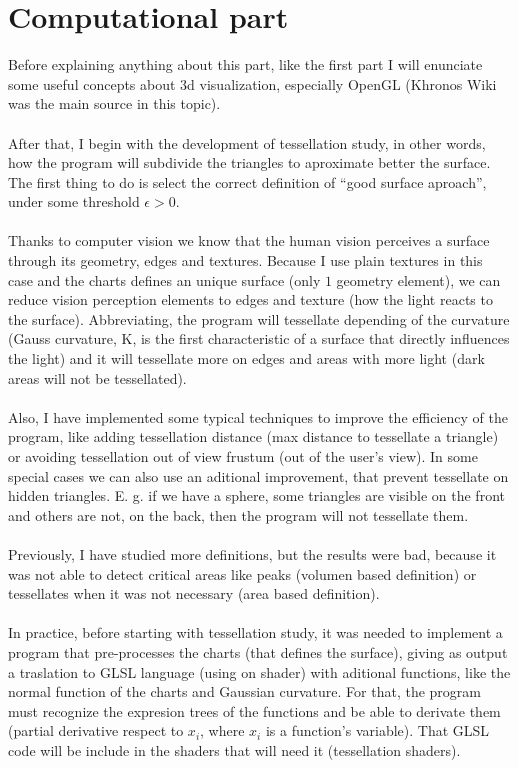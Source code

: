 \section*{Computational part}
Before explaining anything about this part, like the first part I will enunciate some useful concepts about $3$d visualization, especially OpenGL (Khronos Wiki \cite{KhronosWiki} was the main source in this topic).\\
\\After that, I begin with the development of tessellation study, in other words, how the program will subdivide the triangles to aproximate better the surface. The first thing to do is select the correct definition of ``good surface aproach'', under some threshold $\epsilon>0$.\\
\\Thanks to computer vision we know that the human vision perceives a surface through its geometry, edges and textures. Because I use plain textures in this case and the charts defines an unique surface (only $1$ geometry element), we can reduce vision perception elements to edges and texture (how the light reacts to the surface). Abbreviating, the program will tessellate depending of the curvature (Gauss curvature, K, is the first characteristic of a surface that directly influences the light) and it will tessellate more on edges and areas with more light (dark areas will not be tessellated).\\
\\Also, I have implemented some typical techniques to improve the efficiency of the program, like adding tessellation distance (max distance to tessellate a triangle) or avoiding tessellation out of view frustum (out of the user's view). In some special cases we can also use an aditional improvement, that prevent tessellate on hidden triangles. E. g. if we have a sphere, some triangles are visible on the front and others are not, on the back, then the program will not tessellate them.\\
\\Previously, I have studied more definitions, but the results were bad, because it was not able to detect critical areas like peaks (volumen based definition) or tessellates when it was not necessary (area based definition).\\
\\In practice, before starting with tessellation study, it was needed to implement a program that pre-processes the charts (that defines the surface), giving as output a traslation to GLSL language (using on shader) with aditional functions, like the normal function of the charts and Gaussian curvature. For that, the program must recognize the expresion trees of the functions and be able to derivate them (partial derivative respect to $x_i$, where $x_i$ is a function's variable). That GLSL code will be include in the shaders that will need it (tessellation shaders).\\
